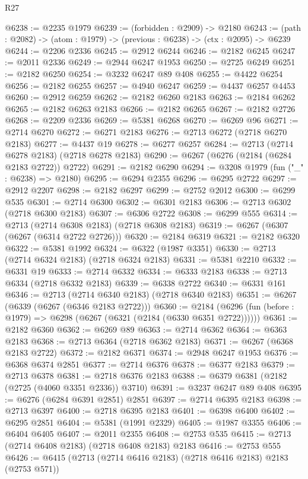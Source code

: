 \begin{lexlean}{R27}
\begin{coremodule}
@6238 := @2235 @1979
@6239 := (forbidden : @2909) -> @2180
@6243 := (path : @2082) -> (atom : @1979) -> (previous : @6238) -> (ctx : @2095) -> @6239
@6244 := @2206 @2336
@6245 := @2912 @6244
@6246 := @2182 @6245
@6247 := @2011 @2336
@6249 := @2944 @6247 @1953
@6250 := @2725 @6249
@6251 := @2182 @6250
@6254 := @3232 @6247 @89 @408
@6255 := @4422 @6254
@6256 := @2182 @6255
@6257 := @4940 @6247
@6259 := @4437 @6257 @4453
@6260 := @2912 @6259
@6262 := @2182 @6260 @2183
@6263 := @2184 @6262
@6265 := @2182 @6263 @2183
@6266 := @2182 @6265
@6267 := @2182 @2726
@6268 := @2209 @2336
@6269 := @5381 @6268
@6270 := @6269 @96
@6271 := @2714 @6270
@6272 := @6271 @2183
@6276 := @2713 @6272 (@2718 @6270 @2183)
@6277 := @4437 @19
@6278 := @6277 @6257
@6284 := @2713 (@2714 @6278 @2183) (@2718 @6278 @2183)
@6290 := @6267 (@6276 (@2184 (@6284 @2183 @2722)) @2722)
@6291 := @2182 @6290
@6294 := @3208 @1979 (fun ("_" : @6238) => @2180)
@6295 := @6294 @2355
@6296 := @6295 @2722
@6297 := @2912 @2207
@6298 := @2182 @6297
@6299 := @2752 @2012
@6300 := @6299 @535
@6301 := @2714 @6300
@6302 := @6301 @2183
@6306 := @2713 @6302 (@2718 @6300 @2183)
@6307 := @6306 @2722
@6308 := @6299 @555
@6314 := @2713 (@2714 @6308 @2183) (@2718 @6308 @2183)
@6319 := @6267 (@6307 (@6267 (@6314 @2722 @2726)))
@6320 := @2184 @6319
@6321 := @2182 @6320
@6322 := @5381 @1992
@6324 := @6322 (@1987 @3351)
@6330 := @2713 (@2714 @6324 @2183) (@2718 @6324 @2183)
@6331 := @5381 @2210
@6332 := @6331 @19
@6333 := @2714 @6332
@6334 := @6333 @2183
@6338 := @2713 @6334 (@2718 @6332 @2183)
@6339 := @6338 @2722
@6340 := @6331 @161
@6346 := @2713 (@2714 @6340 @2183) (@2718 @6340 @2183)
@6351 := @6267 (@6339 (@6267 (@6346 @2183 @2722)))
@6360 := @2184 (@6296 (fun (before : @1979) => @6298 (@6267 (@6321 (@2184 (@6330 @6351 @2722))))))
@6361 := @2182 @6360
@6362 := @6269 @89
@6363 := @2714 @6362
@6364 := @6363 @2183
@6368 := @2713 @6364 (@2718 @6362 @2183)
@6371 := @6267 (@6368 @2183 @2722)
@6372 := @2182 @6371
@6374 := @2948 @6247 @1953
@6376 := @6368 @6374 @2851
@6377 := @2714 @6376
@6378 := @6377 @2183
@6379 := @2713 @6378
@6381 := @2718 @6376 @2183
@6388 := @6379 @6381 (@2182 (@2725 (@4060 @3351 @2336)) @3710)
@6391 := @3237 @6247 @89 @408
@6395 := @6276 (@6284 @6391 @2851) @2851
@6397 := @2714 @6395 @2183
@6398 := @2713 @6397
@6400 := @2718 @6395 @2183
@6401 := @6398 @6400
@6402 := @6295 @2851
@6404 := @5381 (@1991 @2329)
@6405 := @1987 @3355
@6406 := @6404 @6405
@6407 := @2011 @2355
@6408 := @2753 @535
@6415 := @2713 (@2714 @6408 @2183) (@2718 @6408 @2183) @2183
@6416 := @2753 @555
@6426 := @6415 (@2713 (@2714 @6416 @2183) (@2718 @6416 @2183) @2183 (@2753 @571))

\end{coremodule}
\end{lexlean}
